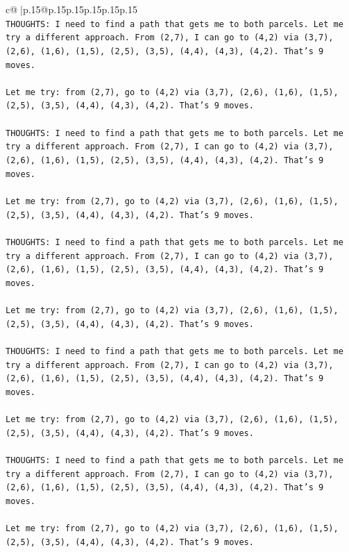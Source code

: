 \documentclass{article}
\begin{document}
{\begin{supertabular}{c@{$\;$}|p{.15\linewidth}@{}p{.15\linewidth}p{.15\linewidth}p{.15\linewidth}p{.15\linewidth}p{.15\linewidth}}
{{{\\ 
\texttt{THOUGHTS: I need to find a path that gets me to both parcels. Let me try a different approach. From (2,7), I can go to (4,2) via (3,7), (2,6), (1,6), (1,5), (2,5), (3,5), (4,4), (4,3), (4,2). That's 9 moves.} \\
\\ 
\texttt{Let me try: from (2,7), go to (4,2) via (3,7), (2,6), (1,6), (1,5), (2,5), (3,5), (4,4), (4,3), (4,2). That's 9 moves.} \\
\\ 
\texttt{THOUGHTS: I need to find a path that gets me to both parcels. Let me try a different approach. From (2,7), I can go to (4,2) via (3,7), (2,6), (1,6), (1,5), (2,5), (3,5), (4,4), (4,3), (4,2). That's 9 moves.} \\
\\ 
\texttt{Let me try: from (2,7), go to (4,2) via (3,7), (2,6), (1,6), (1,5), (2,5), (3,5), (4,4), (4,3), (4,2). That's 9 moves.} \\
\\ 
\texttt{THOUGHTS: I need to find a path that gets me to both parcels. Let me try a different approach. From (2,7), I can go to (4,2) via (3,7), (2,6), (1,6), (1,5), (2,5), (3,5), (4,4), (4,3), (4,2). That's 9 moves.} \\
\\ 
\texttt{Let me try: from (2,7), go to (4,2) via (3,7), (2,6), (1,6), (1,5), (2,5), (3,5), (4,4), (4,3), (4,2). That's 9 moves.} \\
\\ 
\texttt{THOUGHTS: I need to find a path that gets me to both parcels. Let me try a different approach. From (2,7), I can go to (4,2) via (3,7), (2,6), (1,6), (1,5), (2,5), (3,5), (4,4), (4,3), (4,2). That's 9 moves.} \\
\\ 
\texttt{Let me try: from (2,7), go to (4,2) via (3,7), (2,6), (1,6), (1,5), (2,5), (3,5), (4,4), (4,3), (4,2). That's 9 moves.} \\
\\ 
\texttt{THOUGHTS: I need to find a path that gets me to both parcels. Let me try a different approach. From (2,7), I can go to (4,2) via (3,7), (2,6), (1,6), (1,5), (2,5), (3,5), (4,4), (4,3), (4,2). That's 9 moves.} \\
\\ 
\texttt{Let me try: from (2,7), go to (4,2) via (3,7), (2,6), (1,6), (1,5), (2,5), (3,5), (4,4), (4,3), (4,2). That's 9 moves.} \\
\\ 
}}}
\end{supertabular}}
\end{document}
